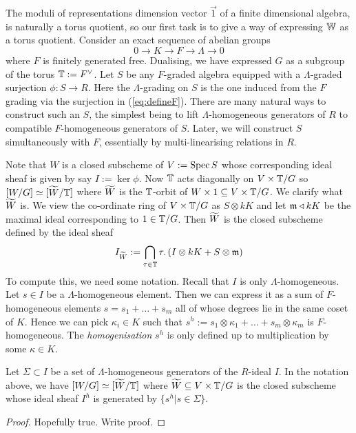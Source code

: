 \documentclass[12pt]{amsart}
\begin{document}
The moduli of representations dimension vector $\vec{1}$ of a finite dimensional algebra, is naturally a torus quotient, so our first task is to give a way of expressing $\mathbb{W}$ as a torus quotient. Consider an exact sequence of abelian groups 
\begin{equation} \label{eq:defineF}
     0 \to K \to F \to \Lambda \to 0
\end{equation}
where $F$ is finitely generated free. Dualising, we have expressed $G$ as a subgroup of the torus $\mathbb{T} := F^{\vee}$. Let $S$ be any $F$-graded algebra equipped with a $\Lambda$-graded surjection $\phi \colon S \to R$. Here the $\Lambda$-grading on $S$ is the one induced from the $F$ grading via the surjection in (\ref{eq:defineF}). There are many natural ways to construct such an $S$, the simplest being to lift $\Lambda$-homogeneous generators of $R$ to compatible $F$-homogeneous generators of $S$. Later, we will construct $S$ simultaneously with $F$, essentially by multi-linearising relations in $R$. 

Note that $W$ is a closed subscheme of $V:= \operatorname{Spec} S$ whose corresponding ideal sheaf is given by say $I:= \ker \phi$. Now $\mathbb{T}$ acts diagonally on $V \times \mathbb{T}/G$ so $[W/G] \simeq [{\widetilde{W}}/\mathbb{T}]$ where ${\widetilde{W}}$ is the $\mathbb{T}$-orbit of $W \times 1 \subseteq V \times \mathbb{T}/G$. We clarify what ${\widetilde{W}}$ is. We view the co-ordinate ring of $V \times \mathbb{T}/G$ as $S \otimes kK$ and let $\mathfrak{m}\triangleleft kK$ be the maximal ideal corresponding to $1 \in \mathbb{T}/G$. Then ${\widetilde{W}}$ is the closed subscheme defined by the ideal sheaf
$$ I_{{\widetilde{W}}} := \bigcap_{\tau \in \mathbb{T}} \tau.\left(I \otimes kK + S \otimes \mathfrak{m} \right)$$
To compute this, we need some notation. Recall that $I$ is only $\Lambda$-homogeneous. Let $s \in I$ be a $\Lambda$-homogeneous element. Then we can express it as a sum of $F$-homogeneous elements $s = s_1 + \ldots + s_m$ all of whose degrees lie in the same coset of $K$. Hence we can pick $\kappa_i \in K$ such that $s^h := s_1 \otimes \kappa_1 + \ldots + s_m \otimes \kappa_m$ is $F$-homogeneous. The {\em homogenisation} $s^h$ is only defined up to multiplication by some $\kappa \in K$. 

\begin{proposition}  \label{prop:torusquotient}
Let $\Sigma \subset I$ be a set of $\Lambda$-homogeneous generators of the $R$-ideal $I$. In the notation above, we have $[W/G] \simeq [{\widetilde{W}}/\mathbb{T}]$ where ${\widetilde{W}} \subseteq V \times \mathbb{T}/G$ is the closed subscheme whose ideal sheaf $I^h$ is generated by $\{s^h | s \in \Sigma\}$. 
\end{proposition}
\begin{proof}
{\red Hopefully true. Write proof.}
\end{proof}
\end{document}
